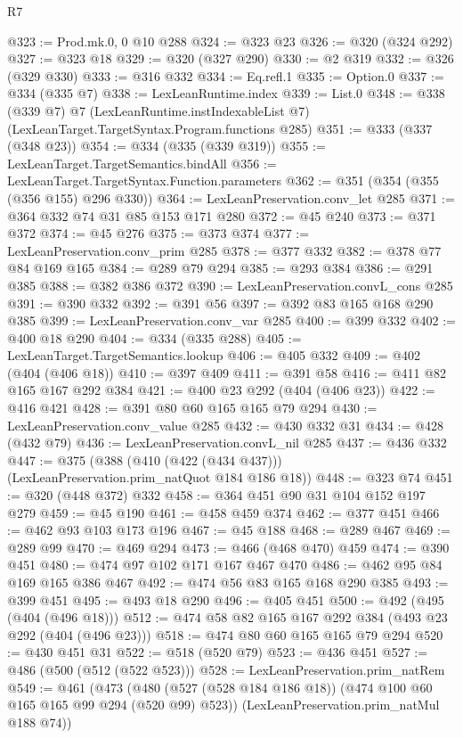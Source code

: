 \begin{lexlean}{R7}
\begin{coremodule}
@323 := Prod.mk.{0, 0} @10 @288
@324 := @323 @23
@326 := @320 (@324 @292)
@327 := @323 @18
@329 := @320 (@327 @290)
@330 := @2 @319
@332 := @326 (@329 @330)
@333 := @316 @332
@334 := Eq.refl.{1}
@335 := Option.{0}
@337 := @334 (@335 @7)
@338 := LexLeanRuntime.index
@339 := List.{0}
@348 := @338
    (@339 @7)
    @7
    (LexLeanRuntime.instIndexableList @7)
    (LexLeanTarget.TargetSyntax.Program.functions @285)
@351 := @333 (@337 (@348 @23))
@354 := @334 (@335 (@339 @319))
@355 := LexLeanTarget.TargetSemantics.bindAll
@356 := LexLeanTarget.TargetSyntax.Function.parameters
@362 := @351 (@354 (@355 (@356 @155) @296 @330))
@364 := LexLeanPreservation.conv_let @285
@371 := @364 @332 @74 @31 @85 @153 @171 @280
@372 := @45 @240
@373 := @371 @372
@374 := @45 @276
@375 := @373 @374
@377 := LexLeanPreservation.conv_prim @285
@378 := @377 @332
@382 := @378 @77 @84 @169 @165
@384 := @289 @79 @294
@385 := @293 @384
@386 := @291 @385
@388 := @382 @386 @372
@390 := LexLeanPreservation.convL_cons @285
@391 := @390 @332
@392 := @391 @56
@397 := @392 @83 @165 @168 @290 @385
@399 := LexLeanPreservation.conv_var @285
@400 := @399 @332
@402 := @400 @18 @290
@404 := @334 (@335 @288)
@405 := LexLeanTarget.TargetSemantics.lookup
@406 := @405 @332
@409 := @402 (@404 (@406 @18))
@410 := @397 @409
@411 := @391 @58
@416 := @411 @82 @165 @167 @292 @384
@421 := @400 @23 @292 (@404 (@406 @23))
@422 := @416 @421
@428 := @391 @80 @60 @165 @165 @79 @294
@430 := LexLeanPreservation.conv_value @285
@432 := @430 @332 @31
@434 := @428 (@432 @79)
@436 := LexLeanPreservation.convL_nil @285
@437 := @436 @332
@447 := @375 (@388 (@410 (@422 (@434 @437))) (LexLeanPreservation.prim_natQuot @184 @186 @18))
@448 := @323 @74
@451 := @320 (@448 @372) @332
@458 := @364 @451 @90 @31 @104 @152 @197 @279
@459 := @45 @190
@461 := @458 @459 @374
@462 := @377 @451
@466 := @462 @93 @103 @173 @196
@467 := @45 @188
@468 := @289 @467
@469 := @289 @99
@470 := @469 @294
@473 := @466 (@468 @470) @459
@474 := @390 @451
@480 := @474 @97 @102 @171 @167 @467 @470
@486 := @462 @95 @84 @169 @165 @386 @467
@492 := @474 @56 @83 @165 @168 @290 @385
@493 := @399 @451
@495 := @493 @18 @290
@496 := @405 @451
@500 := @492 (@495 (@404 (@496 @18)))
@512 := @474 @58 @82 @165 @167 @292 @384 (@493 @23 @292 (@404 (@496 @23)))
@518 := @474 @80 @60 @165 @165 @79 @294
@520 := @430 @451 @31
@522 := @518 (@520 @79)
@523 := @436 @451
@527 := @486 (@500 (@512 (@522 @523)))
@528 := LexLeanPreservation.prim_natRem
@549 := @461
    (@473
      (@480 (@527 (@528 @184 @186 @18)) (@474 @100 @60 @165 @165 @99 @294 (@520 @99) @523))
      (LexLeanPreservation.prim_natMul @188 @74))

\end{coremodule}
\end{lexlean}
